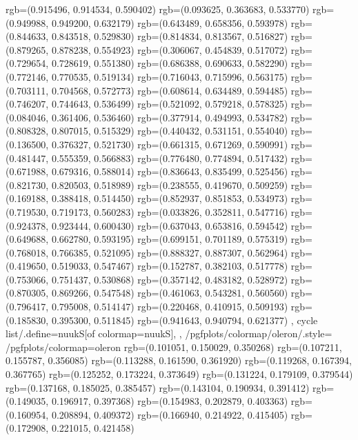 {{{					rgb=(0.915496, 0.914534, 0.590402)
					rgb=(0.093625, 0.363683, 0.533770)
					rgb=(0.949988, 0.949200, 0.632179)
					rgb=(0.643489, 0.658356, 0.593978)
					rgb=(0.844633, 0.843518, 0.529830)
					rgb=(0.814834, 0.813567, 0.516827)
					rgb=(0.879265, 0.878238, 0.554923)
					rgb=(0.306067, 0.454839, 0.517072)
					rgb=(0.729654, 0.728619, 0.551380)
					rgb=(0.686388, 0.690633, 0.582290)
					rgb=(0.772146, 0.770535, 0.519134)
					rgb=(0.716043, 0.715996, 0.563175)
					rgb=(0.703111, 0.704568, 0.572773)
					rgb=(0.608614, 0.634489, 0.594485)
					rgb=(0.746207, 0.744643, 0.536499)
					rgb=(0.521092, 0.579218, 0.578325)
					rgb=(0.084046, 0.361406, 0.536460)
					rgb=(0.377914, 0.494993, 0.534782)
					rgb=(0.808328, 0.807015, 0.515329)
					rgb=(0.440432, 0.531151, 0.554040)
					rgb=(0.136500, 0.376327, 0.521730)
					rgb=(0.661315, 0.671269, 0.590991)
					rgb=(0.481447, 0.555359, 0.566883)
					rgb=(0.776480, 0.774894, 0.517432)
					rgb=(0.671988, 0.679316, 0.588014)
					rgb=(0.836643, 0.835499, 0.525456)
					rgb=(0.821730, 0.820503, 0.518989)
					rgb=(0.238555, 0.419670, 0.509259)
					rgb=(0.169188, 0.388418, 0.514450)
					rgb=(0.852937, 0.851853, 0.534973)
					rgb=(0.719530, 0.719173, 0.560283)
					rgb=(0.033826, 0.352811, 0.547716)
					rgb=(0.924378, 0.923444, 0.600430)
					rgb=(0.637043, 0.653816, 0.594542)
					rgb=(0.649688, 0.662780, 0.593195)
					rgb=(0.699151, 0.701189, 0.575319)
					rgb=(0.768018, 0.766385, 0.521095)
					rgb=(0.888327, 0.887307, 0.562964)
					rgb=(0.419650, 0.519033, 0.547467)
					rgb=(0.152787, 0.382103, 0.517778)
					rgb=(0.753066, 0.751437, 0.530868)
					rgb=(0.357142, 0.483182, 0.528972)
					rgb=(0.870305, 0.869266, 0.547548)
					rgb=(0.461063, 0.543281, 0.560560)
					rgb=(0.796417, 0.795008, 0.514147)
					rgb=(0.220468, 0.410915, 0.509193)
					rgb=(0.185830, 0.395300, 0.511845)
					rgb=(0.941643, 0.940794, 0.621377)
			},
		cycle list/.define={nuukS}{[of colormap=nuukS]},
		},
		/pgfplots/colormap/oleron/.style={
			/pgfplots/colormap={oleron}{%
					rgb=(0.101051, 0.150029, 0.350268)
					rgb=(0.107211, 0.155787, 0.356085)
					rgb=(0.113288, 0.161590, 0.361920)
					rgb=(0.119268, 0.167394, 0.367765)
					rgb=(0.125252, 0.173224, 0.373649)
					rgb=(0.131224, 0.179109, 0.379544)
					rgb=(0.137168, 0.185025, 0.385457)
					rgb=(0.143104, 0.190934, 0.391412)
					rgb=(0.149035, 0.196917, 0.397368)
					rgb=(0.154983, 0.202879, 0.403363)
					rgb=(0.160954, 0.208894, 0.409372)
					rgb=(0.166940, 0.214922, 0.415405)
					rgb=(0.172908, 0.221015, 0.421458)
}}}
